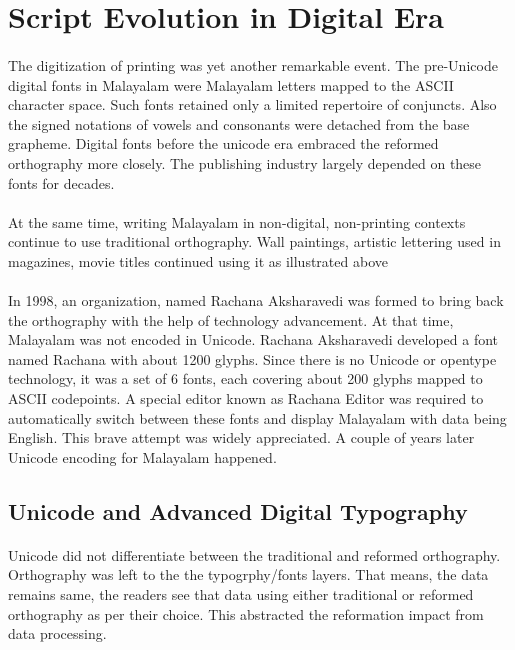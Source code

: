 \documentclass[10pt]{article}
\begin{document}
\section{Script Evolution in Digital Era}

\paragraph{}
The digitization of printing was yet another remarkable event. The pre-Unicode digital fonts in Malayalam were Malayalam letters mapped to the ASCII character space. Such fonts retained only a limited repertoire of conjuncts. Also the signed notations of vowels and consonants were detached from the base grapheme. Digital fonts before the unicode era embraced the reformed orthography more closely. The publishing industry largely depended on these fonts for decades.

\paragraph{}
At the same time, writing Malayalam in non-digital, non-printing contexts continue to use traditional orthography. Wall paintings, artistic lettering used in magazines, movie titles continued using it as illustrated above

\paragraph{}
In 1998, an organization, named Rachana Aksharavedi was formed to bring back the orthography with the help of technology advancement. At that time, Malayalam was not encoded in Unicode. Rachana Aksharavedi developed a font named Rachana with about 1200 glyphs. Since there is no Unicode or opentype technology, it was a set of 6 fonts, each covering about 200 glyphs mapped to ASCII codepoints. A special editor known as Rachana Editor was required to automatically switch between these fonts and display Malayalam with data being English. This brave attempt was widely appreciated. A couple of years later Unicode encoding for Malayalam happened.

\subsection{Unicode and Advanced Digital Typography}

\paragraph{}
Unicode did not differentiate between the traditional and reformed orthography. Orthography was left to the the typogrphy/fonts layers. That means, the data remains same, the readers see that data using either traditional or reformed orthography as per their choice. This abstracted the reformation impact from data processing.
\end{document}
